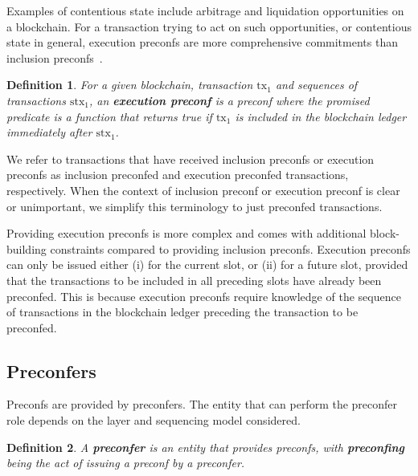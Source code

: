\documentclass[a4paper]{article}
\theoremstyle{boldstyle}
\newtheorem{definitionx}{Definition}
\newenvironment{definition}
  {\begin{defopenboxq}\begin{definitionx}}
  {\end{definitionx}\end{defopenboxq}}
\newcommand{\cm}[1]{\textcolor{blue}{\textbf{Conor:} #1}}
\begin{document}
        Examples of contentious state include arbitrage and liquidation opportunities on a blockchain. For a transaction trying to act on such opportunities, or contentious state in general, execution preconfs are more comprehensive commitments than inclusion preconfs~\cite{W:ATaxonomyofPreconfirmationGuaranteesandTheirSlashingConditionsinRollups}.
        \begin{definition}
        \label{def:execution_preconf}
        For a given blockchain, transaction $\mathrm{tx_1}$ and sequences of transactions $\mathrm{stx}_1$, an \textbf{execution preconf} is a preconf where the promised predicate is a function that returns true if $\mathrm{tx_1}$ is included in the blockchain ledger immediately after $\mathrm{stx}_1$.
        \end{definition}
        We refer to transactions that have received inclusion preconfs or execution preconfs as inclusion preconfed and execution preconfed transactions, respectively. When the context of inclusion preconf or execution preconf is clear or unimportant, we simplify this terminology to just preconfed transactions.
        
        Providing execution preconfs is more complex and comes with additional block-building constraints compared to providing inclusion preconfs. Execution preconfs can only be issued either (i) for the current slot, or (ii) for a future slot, provided that the transactions to be included in all preceding slots have already been preconfed. This is because execution preconfs require knowledge of the sequence of transactions in the blockchain ledger preceding the transaction to be preconfed.
        
    
    \subsection{Preconfers}
    \label{sec:preconfirmers_preliminaries}
        Preconfs are provided by preconfers. The entity that can perform the preconfer role depends on the layer and sequencing model considered. 
        \begin{definition}
        \label{def:preconfirmer}
        A
        \textbf{preconfer} is an entity that provides preconfs, with \textbf{preconfing} being the act of issuing a preconf by a preconfer.  
        \end{definition}
        
\end{document}
